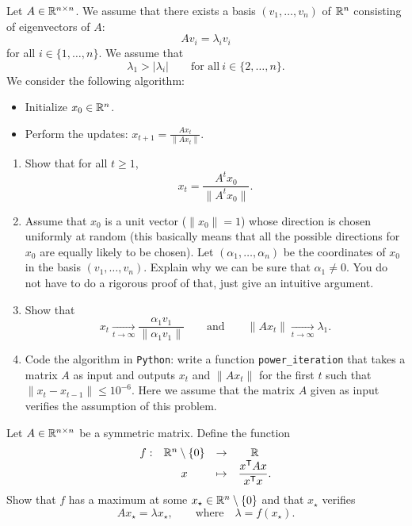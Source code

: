 \documentclass[11pt,nocut]{article}
\begin{document}
\begin{problem}[5 points]
	Let $A \in \mathbb{R}^{n \times n}$. We assume that there exists a basis $(v_1, \dots, v_n)$ of $\mathbb{R}^n$ consisting of eigenvectors of $A$:
	$$
	A v_i = \lambda_i v_i
	$$
	for all $i \in \{1, \dots, n\}$.
	We assume that 
	$$
	\lambda_1 > |\lambda_i| \qquad \text{for all} \ i \in \{2, \dots, n\}.
	$$
	We consider the following algorithm:
	\begin{itemize}
		\item Initialize $x_0 \in \mathbb{R}^n$.
		\item Perform the updates: $x_{t+1} = \frac{A x_t}{\|A x_t\|}$.
	\end{itemize}
	\begin{enumerate}[label=\normalfont(\textbf{\alph*})]
		\item Show that for all $t \geq 1$, 
			$$
			x_t = \frac{A^t x_0}{\|A^t x_0\|}.
			$$
		\item Assume that $x_0$ is a unit vector ($\|x_0\|=1$) whose direction is chosen uniformly at random (this basically means that all the possible directions for $x_0$ are equally likely to be chosen). Let $(\alpha_1, \dots, \alpha_n)$ be the coordinates of $x_0$ in the basis $(v_1, \dots, v_n)$. Explain why we can be sure that $\alpha_1 \neq 0$. You do not have to do a rigorous proof of that, just give an intuitive argument.
		\item Show that
			$$
			x_t \xrightarrow[t \to \infty]{} \frac{\alpha_1 v_1}{\|\alpha_1 v_1\|}
			\qquad \text{and} \qquad
			\|A x_t\| \xrightarrow[t \to \infty]{} \lambda_1.
			$$
		\item Code the algorithm in \texttt{Python}: write a function \texttt{power\_iteration} that takes a matrix $A$ as input and outputs $x_t$ and $\|Ax_t\|$ for the first $t$ such that $\|x_{t}-x_{t-1}\| \leq 10^{-6}$. Here we assume that the matrix $A$ given as input verifies the assumption of this problem.
	\end{enumerate}
\end{problem}

\vspace{1mm}


\begin{problem}[$\star$]
	Let $A \in \mathbb{R}^{n \times n}$ be a symmetric matrix. Define the function
	$$
	\begin{array}{cccc}
		f:& \mathbb{R}^n \setminus \{0\} & \to & \mathbb{R} \\
		  & x & \mapsto & \displaystyle \frac{x^{{\sf T}} A x}{x^{{\sf T}} x}.
	\end{array}
	$$
	Show that $f$ has a maximum at some $x_{\star} \in \mathbb{R}^n \setminus \{0\}$ and that $x_{\star}$ verifies
	$$
	A x_{\star} = \lambda x_{\star}, \qquad \text{where} \quad \lambda = f(x_{\star}).
	$$
\end{problem}
\vspace{1cm}
\centerline{}

%
%
\end{document}
